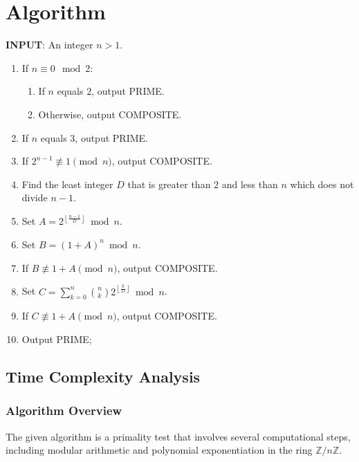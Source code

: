 \documentclass{article}
\theoremstyle{plain}
\theoremstyle{definition}
\begin{document}
\section{Algorithm} \label{section:algorithm}
\textbf{INPUT}: An integer $n > 1$.
\begin{center}
    \begin{enumerate}
        \item If $n \equiv 0 \mod{2}$:
            \begin{enumerate}
                \item If $n$ equals $2$, output PRIME.
                \item Otherwise, output COMPOSITE.
            \end{enumerate}
        \item If $n$ equals $3$, output PRIME.
        \item If $2^{n-1} \not\equiv 1 \pmod{n}$, output COMPOSITE.
        \item Find the least integer $D$ that is greater than 2 and less than $n$ which does not divide $n-1$.
        \item Set $A = 2^{\left\lfloor \frac{n-1}{D} \right\rfloor} \bmod{n}$.
        \item Set $B = (1 + A)^n \bmod{n}$.
        \item If $B \not\equiv 1 + A \pmod{n}$, output COMPOSITE.
        \item Set $C = \sum_{k=0}^{n} \binom{n}{k} 2^{\left\lfloor \frac{k}{D} \right\rfloor} \bmod{n}$.
        \item If $C \not\equiv 1 + A \pmod{n}$, output COMPOSITE.
        \item Output PRIME;
    \end{enumerate}
\end{center}

\subsection{Time Complexity Analysis} \label{subsection:timecomplexity}

\subsubsection{Algorithm Overview}
The given algorithm is a primality test that involves several computational steps, including modular arithmetic and polynomial exponentiation in the ring \(\mathbb{Z}/n\mathbb{Z}\).
\end{document}
